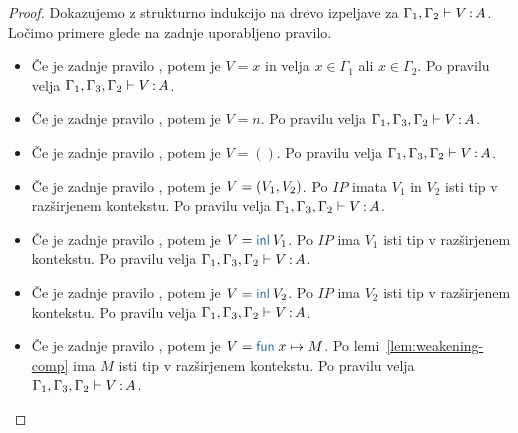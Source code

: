 \begin{proof}
	Dokazujemo z strukturno indukcijo na drevo izpeljave za $\Gamma_1, \Gamma_2 \vdash V \mathinner{:} A$.
	Ločimo primere glede na zadnje uporabljeno pravilo.
	
	\begin{itemize}
		\item[\sitem] Če je zadnje pravilo , potem je $V = x$ in velja $x \in \Gamma_1$ ali $x \in \Gamma_2$. Po pravilu  velja $\Gamma_1, \Gamma_3, \Gamma_2 \vdash V \mathinner{:} A$.
		
		\item Če je zadnje pravilo , potem je $V = n$. Po pravilu  velja $\Gamma_1, \Gamma_3, \Gamma_2 \vdash V \mathinner{:} A$.
		
		\item Če je zadnje pravilo , potem je $V = ()$. Po pravilu  velja $\Gamma_1, \Gamma_3, \Gamma_2 \vdash V \mathinner{:} A$.
		
		\item Če je zadnje pravilo , potem je $V =( V_1 , V_2 )$. Po $IP$ imata $V_1$ in $V_2$ isti tip v razširjenem kontekstu.
		Po pravilu  velja $\Gamma_1, \Gamma_3, \Gamma_2 \vdash V \mathinner{:} A$.
		
		\item Če je zadnje pravilo , potem je $V = \tminl{V_1}$. Po $IP$ ima $V_1$ isti tip v razširjenem kontekstu.
		Po pravilu  velja $\Gamma_1, \Gamma_3, \Gamma_2 \vdash V \mathinner{:} A$.
		
		\item Če je zadnje pravilo , potem je $V = \tminl{V_2}$. Po $IP$ ima $V_2$ isti tip v razširjenem kontekstu.
		Po pravilu  velja $\Gamma_1, \Gamma_3, \Gamma_2 \vdash V \mathinner{:} A$.
		
		\item Če je zadnje pravilo , potem je $V = \tmfunano{x}{M}$. Po lemi~\ref{lem:weakening-comp} ima $M$ isti tip v razširjenem kontekstu.
		Po pravilu  velja $\Gamma_1, \Gamma_3, \Gamma_2 \vdash V \mathinner{:} A$.
		

\end{itemize}
\end{proof}
